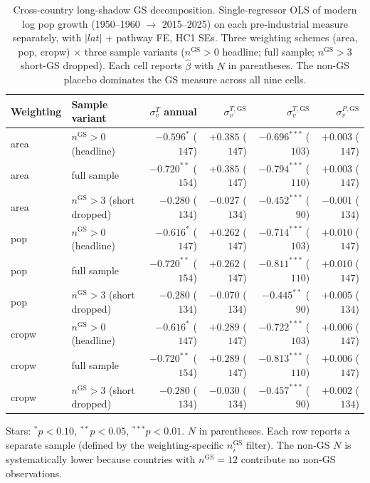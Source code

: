 \documentclass[11pt,letterpaper]{article}
\begin{document}
\begin{table}[H]
\centering
\caption{Cross-country long-shadow GS decomposition. Single-regressor OLS of modern log pop growth (1950--1960 $\to$ 2015--2025) on each pre-industrial measure separately, with $|lat|$ + pathway FE, HC1 SEs. Three weighting schemes (area, pop, cropw) $\times$ three sample variants ($n^{\mathrm{GS}}{>}0$ headline; full sample; $n^{\mathrm{GS}}{>}3$ short-GS dropped). Each cell reports $\hat\beta$ with $N$ in parentheses. The non-GS placebo dominates the GS measure across all nine cells.}
\label{tab:gs-decomp}
\footnotesize
\begin{tabular}{llrrrr}
\toprule
Weighting & Sample variant & $\sigma_v^T$ annual & $\sigma_v^{T,\mathrm{GS}}$ & $\sigma_v^{T,\overline{\mathrm{GS}}}$ & $\sigma_v^{P,\mathrm{GS}}$ \\
\midrule
area  & $n^{\mathrm{GS}}{>}0$ (headline)     & $-0.596^{*}$  ($147$) & $+0.385$  ($147$) & $-0.696^{***}$ ($103$) & $+0.003$  ($147$) \\
area  & full sample                          & $-0.720^{**}$ ($154$) & $+0.385$  ($147$) & $-0.794^{***}$ ($110$) & $+0.003$  ($147$) \\
area  & $n^{\mathrm{GS}}{>}3$ (short dropped)& $-0.280$      ($134$) & $-0.027$  ($134$) & $-0.452^{***}$ ($\phantom{0}90$) & $-0.001$  ($134$) \\
\midrule
pop   & $n^{\mathrm{GS}}{>}0$ (headline)     & $-0.616^{*}$  ($147$) & $+0.262$  ($147$) & $-0.714^{***}$ ($103$) & $+0.010$  ($147$) \\
pop   & full sample                          & $-0.720^{**}$ ($154$) & $+0.262$  ($147$) & $-0.811^{***}$ ($110$) & $+0.010$  ($147$) \\
pop   & $n^{\mathrm{GS}}{>}3$ (short dropped)& $-0.280$      ($134$) & $-0.070$  ($134$) & $-0.445^{**}$ ($\phantom{0}90$) & $+0.005$  ($134$) \\
\midrule
cropw & $n^{\mathrm{GS}}{>}0$ (headline)     & $-0.616^{*}$  ($147$) & $+0.289$  ($147$) & $-0.722^{***}$ ($103$) & $+0.006$  ($147$) \\
cropw & full sample                          & $-0.720^{**}$ ($154$) & $+0.289$  ($147$) & $-0.813^{***}$ ($110$) & $+0.006$  ($147$) \\
cropw & $n^{\mathrm{GS}}{>}3$ (short dropped)& $-0.280$      ($134$) & $-0.030$  ($134$) & $-0.457^{***}$ ($\phantom{0}90$) & $+0.002$  ($134$) \\
\bottomrule
\end{tabular}
\par\smallskip\footnotesize{Stars: $^{*}p{<}0.10$, $^{**}p{<}0.05$, $^{***}p{<}0.01$. $N$ in parentheses. Each row reports a separate sample (defined by the weighting-specific $n^{\mathrm{GS}}_i$ filter). The non-GS $N$ is systematically lower because countries with $n^{\mathrm{GS}}{=}12$ contribute no non-GS observations.}
\end{table}
\end{document}
